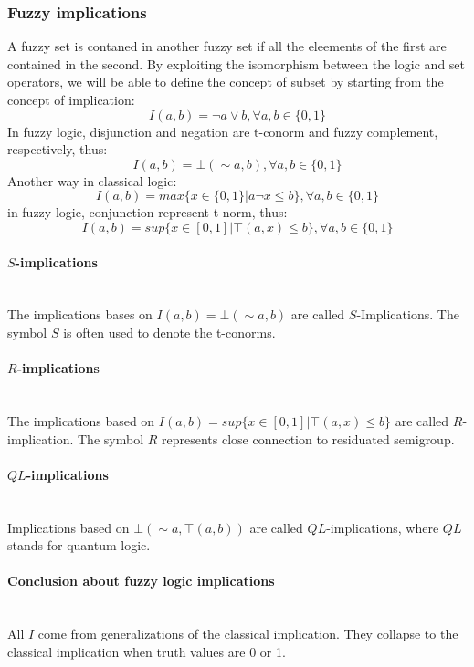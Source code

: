 \documentclass{article}
\begin{document}
\subsubsection{Fuzzy implications}
A fuzzy set is contaned in another fuzzy set if all the eleements of the first are contained
in the second. By exploiting the isomorphism between the logic and set operators, we will be
able to define the concept of subset by starting from the concept of implication:
$$I(a,b)=\lnot a\lor b, \forall a,b \in \{0,1\}$$
In fuzzy logic, disjunction and negation are t-conorm and fuzzy complement, respectively, thus:
$$I(a,b)=\bot(\sim a,b), \forall a,b\in \{0,1\}$$
Another way in classical logic:
$$I(a,b)=max\{x\in\{0,1\}|a\lnot x\leq b\}, \forall a,b\in\{0,1\}$$
in fuzzy logic, conjunction represent t-norm, thus:
$$I(a,b)=sup\{x\in[0,1]|\top (a,x)\leq b\}, \forall a,b\in\{0,1\}$$


\paragraph{$S$-implications}\mbox{}\\
The implications bases on $I(a,b)=\bot(\sim a,b)$ are called $S$-Implications. The symbol
$S$ is often used to denote the t-conorms.

\paragraph{$R$-implications}\mbox{}\\
The implications based on $I(a,b)=sup\{x\in[0,1]|\top (a,x)\leq b\}$ are called $R$-implication.
The symbol $R$ represents close connection to residuated semigroup.

\paragraph{$QL$-implications}\mbox{}\\
Implications based on $\bot(\sim a,\top(a,b))$ are called $QL$-implications, where $QL$ stands
for quantum logic.

\paragraph{Conclusion about fuzzy logic implications}\mbox{}\\
All $I$ come from generalizations of the classical implication. They collapse to the classical
implication when truth values are 0 or 1.
\end{document}
